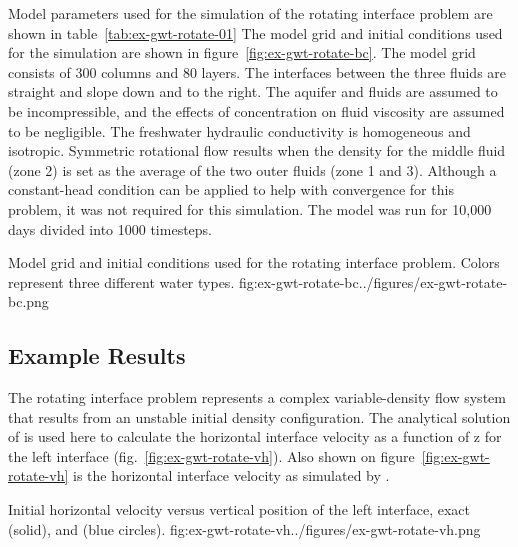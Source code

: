 Model parameters used for the \mf simulation of the rotating interface problem are shown in table~\ref{tab:ex-gwt-rotate-01} The model grid and initial conditions used for the \mf simulation are shown in figure~\ref{fig:ex-gwt-rotate-bc}. The model grid consists of 300 columns and 80 layers.  The interfaces between the three fluids are straight and slope down and to the right. The aquifer and fluids are assumed to be incompressible, and the effects of concentration on fluid viscosity are assumed to be negligible. The freshwater hydraulic conductivity is homogeneous and isotropic. Symmetric rotational flow results when the density for the middle fluid (zone 2) is set as the average of the two outer fluids (zone 1 and 3).   Although a constant-head condition can be applied to help with convergence for this problem, it was not required for this \mf simulation.  The \mf model was run for 10,000 days  divided into 1000 timesteps. 



\begin{StandardFigure}{
                                     Model grid and initial conditions used for the rotating interface problem.  Colors represent three different water types.
                                     }{fig:ex-gwt-rotate-bc}{../figures/ex-gwt-rotate-bc.png}
\end{StandardFigure}                                 


\subsection{Example Results}

The rotating interface problem represents a complex variable-density flow system that results from an unstable initial density configuration.  The analytical solution of \cite{bakker2004} is used here to calculate the horizontal interface velocity as a function of z for the left interface (fig.~\ref{fig:ex-gwt-rotate-vh}).  Also shown on figure~\ref{fig:ex-gwt-rotate-vh} is the horizontal interface velocity as simulated by \mf.  

\begin{StandardFigure}{
                                     Initial horizontal velocity versus vertical position of the left interface, exact (solid), and \mf (blue circles).
                                     }{fig:ex-gwt-rotate-vh}{../figures/ex-gwt-rotate-vh.png}
\end{StandardFigure}                                 

